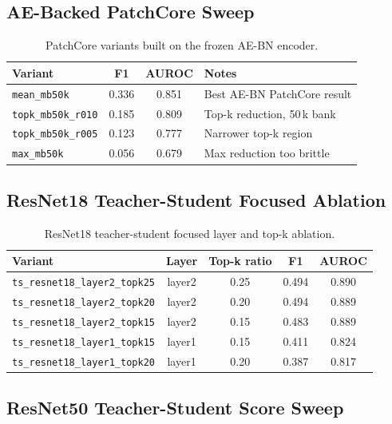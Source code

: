 \documentclass[11pt]{article}
\begin{document}
\subsection{AE-Backed PatchCore Sweep}

\begin{table}[H]
\centering
\caption{PatchCore variants built on the frozen AE-BN encoder.}
\label{tab:appendix_aebn_patchcore}
\begin{tabularx}{\linewidth}{lcc>{\raggedright\arraybackslash}X}
\toprule
Variant & F1 & AUROC & Notes \\
\midrule
\texttt{mean\_mb50k}       & 0.336 & 0.851 & Best AE-BN PatchCore result \\
\texttt{topk\_mb50k\_r010} & 0.185 & 0.809 & Top-k reduction, 50\,k bank \\
\texttt{topk\_mb50k\_r005} & 0.123 & 0.777 & Narrower top-k region \\
\texttt{max\_mb50k}        & 0.056 & 0.679 & Max reduction too brittle \\
\bottomrule
\end{tabularx}
\end{table}

\subsection{ResNet18 Teacher-Student Focused Ablation}

\begin{table}[H]
\centering
\caption{ResNet18 teacher-student focused layer and top-k ablation.}
\label{tab:appendix_ts_resnet18}
\begin{tabular}{lcccc}
\toprule
Variant & Layer & Top-k ratio & F1 & AUROC \\
\midrule
\texttt{ts\_resnet18\_layer2\_topk25} & layer2 & 0.25 & 0.494 & 0.890 \\
\texttt{ts\_resnet18\_layer2\_topk20} & layer2 & 0.20 & 0.494 & 0.889 \\
\texttt{ts\_resnet18\_layer2\_topk15} & layer2 & 0.15 & 0.483 & 0.889 \\
\texttt{ts\_resnet18\_layer1\_topk15} & layer1 & 0.15 & 0.411 & 0.824 \\
\texttt{ts\_resnet18\_layer1\_topk20} & layer1 & 0.20 & 0.387 & 0.817 \\
\bottomrule
\end{tabular}
\end{table}

\subsection{ResNet50 Teacher-Student Score Sweep}
\end{document}
